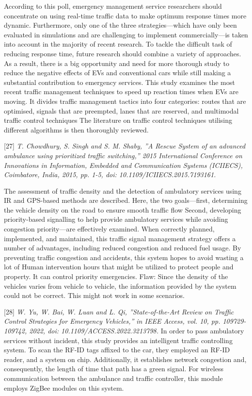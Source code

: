 \documentclass[conference]{IEEEtran}
\begin{document}
According to this poll, emergency management service researchers should concentrate on using real-time traffic data to make optimum response times more dynamic. Furthermore, only one of the three strategies—which have only been evaluated in simulations and are challenging to implement commercially—is taken into account in the majority of recent research. To tackle the difficult task of reducing response time, future research should combine a variety of approaches. As a result, there is a big opportunity and need for more thorough study to reduce the negative effects of EVs and conventional cars while still making a substantial contribution to emergency services. This study examines the most recent traffic management techniques to speed up reaction times when EVs are moving. It divides traffic management tactics into four categories: routes that are optimised, signals that are preempted, lanes that are reserved, and multimodal traffic control techniques The literature on traffic control techniques utilising different algorithms is then thoroughly reviewed.

[27]\emph{ T. Chowdhury, S. Singh and S. M. Shaby, ”A Rescue
System of an advanced ambulance using prioritized traffic
switching,” 2015 International Conference on Innovations in
Information, Embedded and Communication Systems (ICIIECS), Coimbatore, India, 2015, pp. 1-5, doi: 10.1109/ICIIECS.2015.7193161. }

The assessment of traffic density and the detection of ambulatory services using IR and GPS-based methods are described. Here, the two goals—first, determining the vehicle density on the road to ensure smooth traffic flow Second, developing priority-based signalling to help provide ambulatory services while avoiding congestion priority—are effectively examined. When correctly planned, implemented, and maintained, this traffic signal management strategy offers a number of advantages, including reduced congestion and reduced fuel usage. By preventing traffic congestion and accidents, this system hopes to avoid wasting a lot of Human intervention hours that might be utilized to protect people and property. It can control priority emergencies. 
Flaw: Since the density of the vehicles varies from vehicle to vehicle, the information provided by the system could not be correct. This might not work in some scenarios.

[28]\emph{ W. Yu, W. Bai, W. Luan and L. Qi, ”State-of-the-Art
Review on Traffic Control Strategies for Emergency Vehicles,”
in IEEE Access, vol. 10, pp. 109729-109742, 2022, doi:
10.1109/ACCESS.2022.3213798.
}
In order to pass ambulatory services without incident, this study provides an intelligent traffic controlling system. To scan the RF-ID tags affixed to the car, they employed an RF-ID reader, and a system on chip. Additionally, it establishes network congestion and, consequently, the length of time that path has a green signal. For wireless communication between the ambulance and traffic controller, this module employs ZigBee modules on this system. 
\end{document}
